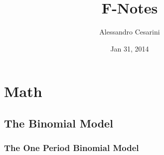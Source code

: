 \documentclass[a4paper,10pt]{report}
\title{F-Notes}
\author{Alessandro Cesarini}
\date{Jan 31, 2014}
\theoremstyle{plain}
\theoremstyle{definition}
\begin{document}
\maketitle

\tableofcontents

\smallskip


\chapter{Math}

\section{The Binomial Model }

\subsection{The One Period Binomial Model \label{topbm}}
\end{document}
